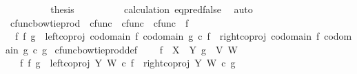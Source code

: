 \begin{isabellebody}
\ \ \ \ \ \ \isamarkupfalse%
\ \isamarkupfalse%
\ {\isacharquery}{\kern0pt}thesis\isanewline
\ \ \ \ \ \ \ \ \isamarkupfalse%
\ calculation\ eq{\isacharunderscore}{\kern0pt}pred{\isacharunderscore}{\kern0pt}false\ \isamarkupfalse%
\ auto\isanewline
\ \ \ \ \isamarkupfalse%
\isanewline
\ \ \isamarkupfalse%
\isanewline
{}\isamarkupfalse%
%
\endisatagproof
{\isafoldproof}%
%
\isadelimproof
%
\endisadelimproof
%
\isadelimdocument
%
\endisadelimdocument
%
\isatagdocument
%
\isamarkuptrue%
%
\endisatagdocument
{\isafolddocument}%
%
\isadelimdocument
%
\endisadelimdocument
{}\isamarkupfalse%
\ cfunc{\isacharunderscore}{\kern0pt}bowtie{\isacharunderscore}{\kern0pt}prod\ {\isacharcolon}{\kern0pt}{\isacharcolon}{\kern0pt}\ {\isachardoublequoteopen}cfunc\ {\isasymRightarrow}\ cfunc\ {\isasymRightarrow}\ cfunc{\isachardoublequoteclose}\ {\isacharparenleft}{\kern0pt}\ {\isachardoublequoteopen}{\isasymbowtie}\isactrlsub f{\isachardoublequoteclose}\ {}{}{\isacharparenright}{\kern0pt}\ \isanewline
\ \ {\isachardoublequoteopen}f\ {\isasymbowtie}\isactrlsub f\ g\ {\isacharequal}{\kern0pt}\ {\isacharparenleft}{\kern0pt}{\isacharparenleft}{\kern0pt}left{\isacharunderscore}{\kern0pt}coproj\ {\isacharparenleft}{\kern0pt}codomain\ f{\isacharparenright}{\kern0pt}\ {\isacharparenleft}{\kern0pt}codomain\ g{\isacharparenright}{\kern0pt}{\isacharparenright}{\kern0pt}\ {\isasymcirc}\isactrlsub c\ f{\isacharparenright}{\kern0pt}\ {\isasymamalg}\ {\isacharparenleft}{\kern0pt}{\isacharparenleft}{\kern0pt}right{\isacharunderscore}{\kern0pt}coproj\ {\isacharparenleft}{\kern0pt}codomain\ f{\isacharparenright}{\kern0pt}\ {\isacharparenleft}{\kern0pt}codomain\ g{\isacharparenright}{\kern0pt}{\isacharparenright}{\kern0pt}\ {\isasymcirc}\isactrlsub c\ g{\isacharparenright}{\kern0pt}{\isachardoublequoteclose}\isanewline
\isanewline
{}\isamarkupfalse%
\ cfunc{\isacharunderscore}{\kern0pt}bowtie{\isacharunderscore}{\kern0pt}prod{\isacharunderscore}{\kern0pt}def{}{\isacharcolon}{\kern0pt}\ \isanewline
\ \ \ {\isachardoublequoteopen}f\ {\isacharcolon}{\kern0pt}\ X\ {\isasymrightarrow}\ Y{\isachardoublequoteclose}\ {\isachardoublequoteopen}g\ {\isacharcolon}{\kern0pt}\ V{\isasymrightarrow}\ W{\isachardoublequoteclose}\isanewline
\ \ \ {\isachardoublequoteopen}f\ {\isasymbowtie}\isactrlsub f\ g\ {\isacharequal}{\kern0pt}\ {\isacharparenleft}{\kern0pt}left{\isacharunderscore}{\kern0pt}coproj\ Y\ W\ {\isasymcirc}\isactrlsub c\ f{\isacharparenright}{\kern0pt}\ {\isasymamalg}\ {\isacharparenleft}{\kern0pt}right{\isacharunderscore}{\kern0pt}coproj\ Y\ W\ {\isasymcirc}\isactrlsub c\ g{\isacharparenright}{\kern0pt}{\isachardoublequoteclose}\isanewline

\end{isabellebody}
